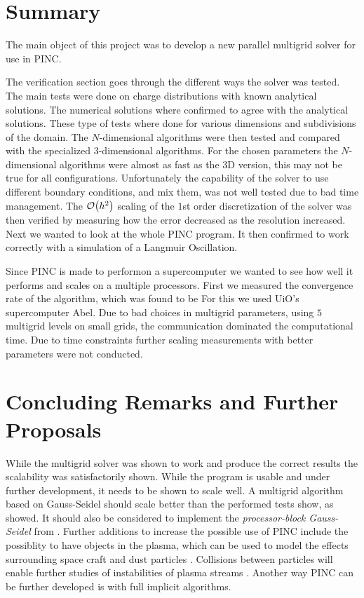 
\section{Summary}
	The main object of this project was to develop a new parallel multigrid solver
	for use in PINC.

	The verification section goes through the different ways the
	solver was tested. The main tests were done on charge distributions
	with known analytical solutions. The numerical solutions where confirmed to
 	agree with the analytical solutions. These type of tests where done for various
	dimensions and subdivisions of the domain. The \(N\)-dimensional algorithms were
	then tested and compared with the specialized \(3\)-dimensional algorithms. For the chosen
	parameters the \(N\)-dimensional algorithms were almost as fast as the \(3\)D version, this may not be true
	for all configurations. Unfortunately the capability of the solver to use different boundary conditions, and mix them,
 	was not well tested due to bad time management.
	The \(\order{h^2}\) scaling of the \(1\)st order discretization of the solver
 	was then verified by measuring how the error decreased as the resolution increased.
	Next we wanted to look at the whole PINC program. It then confirmed to work correctly
	with a simulation of a Langmuir Oscillation.

	Since PINC is made to performon a supercomputer we wanted to see how well it
	performs and scales on a multiple processors. First we measured the convergence rate of the algorithm,
	which was found to be For this we used UiO's supercomputer Abel.
	Due to bad choices in multigrid parameters, using \(5\) multigrid levels on small grids, the communication
	dominated the computational time. Due to time constraints further scaling measurements with better
	parameters were not conducted.



\section{Concluding Remarks and Further Proposals}
	While the multigrid solver was shown to work and produce the correct results the scalability
	was satisfactorily shown. While the program is usable and under further development, it needs to be shown
	to scale well. A multigrid algorithm based on Gauss-Seidel should scale better than the performed tests show,
	as \citet{jung_parallelization_1997} showed. It should also be considered to implement the \textit{processor-block Gauss-Seidel}
	from \citet{adams_parallel_2003}. Further additions to increase the possible use of PINC include
	the possiblity to have objects in the plasma, which can be used to model the effects surrounding space craft
	and dust particles \citep{miloch_wake_2010,miyake_plasma_2013,ergun_spacecraft_2010}. Collisions
	between particles will enable further studies of instabilities of plasma streams \citep{brackbill_particle_1995}.
	Another way PINC can be further developed is with full implicit algorithms.  
